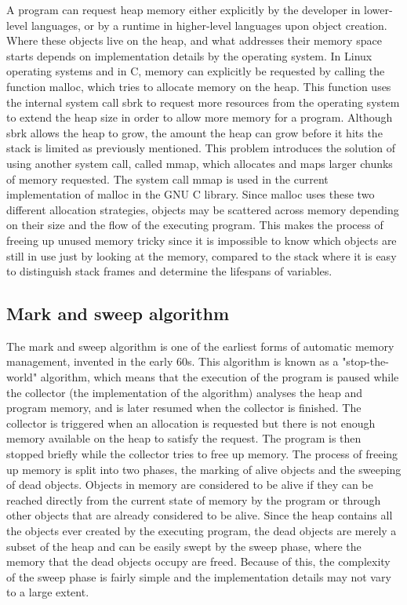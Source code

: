 A program can request heap memory either explicitly by the developer in lower-level languages, or by
a runtime in higher-level languages upon object creation. Where these objects live on the heap, and
what addresses their memory space starts depends on implementation details by the operating system.
In Linux operating systems and in C, memory can explicitly be requested by calling the function
malloc, which tries to allocate memory on the heap. This function uses the internal system call sbrk
to request more resources from the operating system to extend the heap size in order to allow
more memory for a program.\cite[p.~188]{KandR} Although sbrk allows the heap to grow, the amount the heap
can grow before it hits the stack is limited as previously mentioned. This problem introduces
the solution of using another system call, called mmap, which allocates and maps larger chunks of memory
requested. The system call mmap is used in the current implementation of malloc in the GNU C library.\cite{mallocSrcCode}
Since malloc uses these two different allocation strategies, objects may be scattered across memory
depending on their size and the flow of the executing program. This makes the process of freeing
up unused memory tricky since it is impossible to know which objects are still in use just by
looking at the memory, compared to the stack where it is easy to distinguish stack frames and determine
the lifespans of variables.

\subsection{Mark and sweep algorithm}
The mark and sweep algorithm is one of the earliest forms of automatic memory management, invented
in the early 60s.\cite{MandSproject} This algorithm is known as a "stop-the-world" algorithm,
which means that the execution of the program is paused while the collector (the implementation
of the algorithm) analyses the heap and program memory, and is later resumed when the collector
is finished. The collector is triggered when an allocation is requested but
there is not enough memory available on the heap to satisfy the request.\cite[p.~18]{gcollHandbook}
The program is then
stopped briefly while the collector tries to free up memory. The process of freeing up memory is
split into two phases, the marking of alive objects and the sweeping of dead objects. Objects in
memory are considered to be alive if they can be reached directly from the current state of
memory by the program or through other objects that are already considered to be alive.
Since the heap contains all the objects ever created by the executing program, the dead objects
are merely a subset of the heap and can be easily swept by the sweep phase, where the memory
that the dead objects occupy are freed. Because of this, the complexity of the sweep phase
is fairly simple and the implementation details may not vary to a large extent.\\

